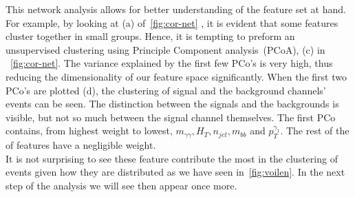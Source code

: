 \FloatBarrier
This network analysis allows for better understanding of the feature set at hand. For example, by looking at (a) of~\autoref{fig:cor-net} , it is evident that some features cluster together in small groups. Hence, it is tempting to preform an unsupervised clustering using Principle Component analysis~(PCoA),  (c) in ~\autoref{fig:cor-net}. The variance explained by the first few PCo's is very high, thus reducing the dimensionality of our feature space significantly. When the first two PCo's are plotted (d), the clustering of signal and the background channels' events can be seen. The distinction between the signals  and the backgrounds is visible, but not so much between the signal channel themselves.  The first PCo contains, from highest weight to lowest, $m_{\gamma \gamma}, H_T, n_{jet}, m_{bb}$ and $p_T^{\gamma_1}$. The rest of the of features have a negligible weight. \\ It is not surprising to see these feature contribute the most in the clustering of events given how they are distributed as we have seen in~\autoref{fig:voilen}. In the next step of the analysis we will see then appear once more.
